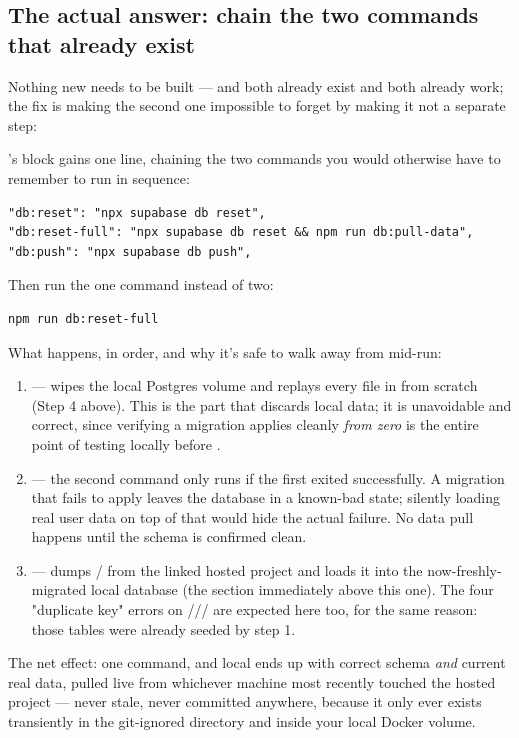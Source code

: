 \subsection{The actual answer: chain the two commands that already exist}

Nothing new needs to be built —  and  both already exist and both already work; the fix is making the second one impossible to forget by making it not a separate step:

\begin{olkhowto}
's  block gains one line, chaining the two commands you would otherwise have to remember to run in sequence:
\begin{lstlisting}[caption={package.json — the new script, alongside the two it reuses}]
"db:reset": "npx supabase db reset",
"db:reset-full": "npx supabase db reset && npm run db:pull-data",
"db:push": "npx supabase db push",
\end{lstlisting}
Then run the one command instead of two:
\begin{lstlisting}[style=olkcodebash, caption={The whole daily-safe reset, start to finish}]
npm run db:reset-full
\end{lstlisting}
What happens, in order, and why it's safe to walk away from mid-run:
\begin{enumerate}
  \item \textbf{} — wipes the local Postgres volume and replays every file in  from scratch (Step 4 above). This is the part that discards local data; it is unavoidable and correct, since verifying a migration applies cleanly \emph{from zero} is the entire point of testing locally before .
  \item \code{\&\&} — the second command only runs if the first exited successfully. A migration that fails to apply leaves the database in a known-bad state; silently loading real user data on top of that would hide the actual failure. No data pull happens until the schema is confirmed clean.
  \item \textbf{} — dumps / from the linked hosted project and loads it into the now-freshly-migrated local database (the section immediately above this one). The four "duplicate key" errors on /// are expected here too, for the same reason: those tables were already seeded by step 1.
\end{enumerate}
The net effect: one command, and local ends up with correct schema \emph{and} current real data, pulled live from whichever machine most recently touched the hosted project — never stale, never committed anywhere, because it only ever exists transiently in the git-ignored  directory and inside your local Docker volume.
\end{olkhowto}

